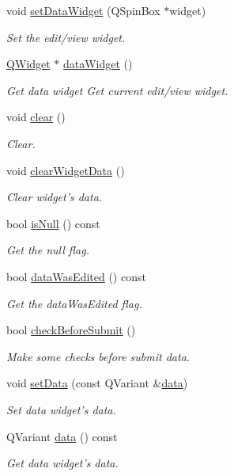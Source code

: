 \begin{DoxyCompactItemize}
void \hyperlink{classmdt_sql_field_handler_a13a1e634bdb0d5c85ab1198aa09a64e2}{set\-Data\-Widget} (Q\-Spin\-Box $\ast$widget)
\begin{DoxyCompactList}\small\item\em Set the edit/view widget. \end{DoxyCompactList}\item 
\hyperlink{class_q_widget}{Q\-Widget} $\ast$ \hyperlink{classmdt_sql_field_handler_a91ab8160d5015b6030e7169ab7108d33}{data\-Widget} ()
\begin{DoxyCompactList}\small\item\em Get data widget Get current edit/view widget. \end{DoxyCompactList}\item 
void \hyperlink{classmdt_sql_field_handler_a10467d49304f7bc0c75e280098e3e0bc}{clear} ()
\begin{DoxyCompactList}\small\item\em Clear. \end{DoxyCompactList}\item 
void \hyperlink{classmdt_sql_field_handler_ad482be9d476c3310373078a6cd949714}{clear\-Widget\-Data} ()
\begin{DoxyCompactList}\small\item\em Clear widget's data. \end{DoxyCompactList}\item 
bool \hyperlink{classmdt_sql_field_handler_a32c52fa21b4a0e2165e1fbbb8f7fe3b7}{is\-Null} () const 
\begin{DoxyCompactList}\small\item\em Get the null flag. \end{DoxyCompactList}\item 
bool \hyperlink{classmdt_sql_field_handler_a08ed5d8dde1447a5bc42af003551641f}{data\-Was\-Edited} () const 
\begin{DoxyCompactList}\small\item\em Get the data\-Was\-Edited flag. \end{DoxyCompactList}\item 
bool \hyperlink{classmdt_sql_field_handler_abb37a65b248a02a126676b45ee90789a}{check\-Before\-Submit} ()
\begin{DoxyCompactList}\small\item\em Make some checks before submit data. \end{DoxyCompactList}\item 
void \hyperlink{classmdt_sql_field_handler_a14478a0cd018cf2803dd41061c901aad}{set\-Data} (const Q\-Variant \&\hyperlink{classmdt_sql_field_handler_a87e0184853f31ac3236a6b05179192c8}{data})
\begin{DoxyCompactList}\small\item\em Set data widget's data. \end{DoxyCompactList}\item 
Q\-Variant \hyperlink{classmdt_sql_field_handler_a1ca9ec373a844a3dcf5f46807259171f}{data} () const 
\begin{DoxyCompactList}\small\item\em Get data widget's data. \end{DoxyCompactList}\end{DoxyCompactItemize}
